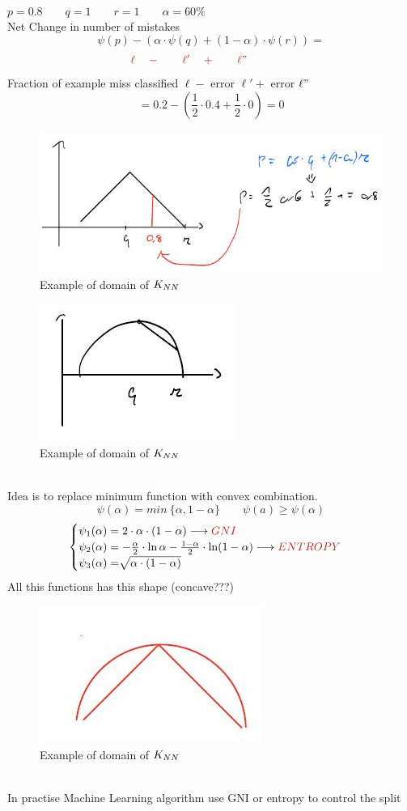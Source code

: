 \documentclass[../main.tex]{subfiles}
\begin{document}
\\
$ p = 0.8 \qquad q = 1 \qquad r = 1 \qquad \alpha = 60\%$
\\
Net Change in number of mistakes\\
$$
\psi(p) - (\alpha \cdot \psi(q) + (1- \alpha ) \cdot \psi (r) ) = 
$$
$$
\red{
\qquad \qquad  \ell \quad- \qquad \ell' \quad+ \qquad \ell" \qquad \qquad  \qquad \qquad 
}$$
Fraction of example miss classified $\ell -$ error $\ell' +$  error $\ell"$ \\
$$
= 0.2 - ( \frac{1}{2} \cdot 0.4 + \frac{1}{2} \cdot 0 ) = 0  
$$
\begin{figure}[h]
    \centering
    \includegraphics[width=0.6\linewidth]{../img/lez5-img7.JPG}
    \caption{Example of domain of $K_{NN}$}
\end{figure}
\begin{figure}[h]
    \centering
    \includegraphics[width=0.4\linewidth]{../img/lez5-img8.JPG}
    \caption{Example of domain of $K_{NN}$}
\end{figure}
\\
Idea is to replace minimum function with convex combination.
$$
\psi(\alpha) = min\ \{\alpha, 1-\alpha\} \qquad \psi(a) \geq \psi(\alpha)
$$
$$
\begin{cases}
\psi_1(\alpha) = 2\cdot\alpha \cdot (1-\alpha) \longrightarrow \red{GNI} \\
\psi_2(\alpha)= -\frac{\alpha}{2}\cdot \ln \alpha - \frac{1-\alpha}{2} \cdot \ln (1-\alpha)\longrightarrow \red{ENTROPY} \\
\psi_3(\alpha) = \sqrt[]{\alpha \cdot (1-\alpha
)}
\end{cases}
$$
All this functions has this shape (concave???)
\begin{figure}[h]
    \centering
    \includegraphics[width=0.4\linewidth]{../img/lez5-img9.JPG}
    \caption{Example of domain of $K_{NN}$}
\end{figure}
\\
In practise Machine Learning algorithm use GNI or entropy to control the split
\end{document}
